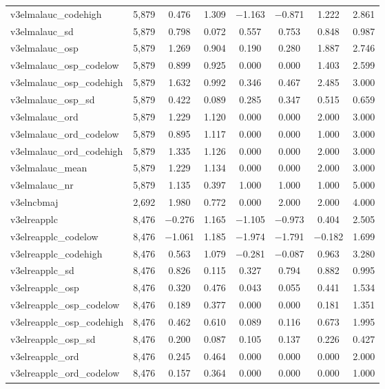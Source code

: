\begin{table}[!htbp]
\begin{tabular}{@{\extracolsep{5pt}}lccccccc}
v3elmalauc\_codehigh & 5,879 & 0.476 & 1.309 & $-$1.163 & $-$0.871 & 1.222 & 2.861 \\ 
v3elmalauc\_sd & 5,879 & 0.798 & 0.072 & 0.557 & 0.753 & 0.848 & 0.987 \\ 
v3elmalauc\_osp & 5,879 & 1.269 & 0.904 & 0.190 & 0.280 & 1.887 & 2.746 \\ 
v3elmalauc\_osp\_codelow & 5,879 & 0.899 & 0.925 & 0.000 & 0.000 & 1.403 & 2.599 \\ 
v3elmalauc\_osp\_codehigh & 5,879 & 1.632 & 0.992 & 0.346 & 0.467 & 2.485 & 3.000 \\ 
v3elmalauc\_osp\_sd & 5,879 & 0.422 & 0.089 & 0.285 & 0.347 & 0.515 & 0.659 \\ 
v3elmalauc\_ord & 5,879 & 1.229 & 1.120 & 0.000 & 0.000 & 2.000 & 3.000 \\ 
v3elmalauc\_ord\_codelow & 5,879 & 0.895 & 1.117 & 0.000 & 0.000 & 1.000 & 3.000 \\ 
v3elmalauc\_ord\_codehigh & 5,879 & 1.335 & 1.126 & 0.000 & 0.000 & 2.000 & 3.000 \\ 
v3elmalauc\_mean & 5,879 & 1.229 & 1.134 & 0.000 & 0.000 & 2.000 & 3.000 \\ 
v3elmalauc\_nr & 5,879 & 1.135 & 0.397 & 1.000 & 1.000 & 1.000 & 5.000 \\ 
v3elncbmaj & 2,692 & 1.980 & 0.772 & 0.000 & 2.000 & 2.000 & 4.000 \\ 
v3elreapplc & 8,476 & $-$0.276 & 1.165 & $-$1.105 & $-$0.973 & 0.404 & 2.505 \\ 
v3elreapplc\_codelow & 8,476 & $-$1.061 & 1.185 & $-$1.974 & $-$1.791 & $-$0.182 & 1.699 \\ 
v3elreapplc\_codehigh & 8,476 & 0.563 & 1.079 & $-$0.281 & $-$0.087 & 0.963 & 3.280 \\ 
v3elreapplc\_sd & 8,476 & 0.826 & 0.115 & 0.327 & 0.794 & 0.882 & 0.995 \\ 
v3elreapplc\_osp & 8,476 & 0.320 & 0.476 & 0.043 & 0.055 & 0.441 & 1.534 \\ 
v3elreapplc\_osp\_codelow & 8,476 & 0.189 & 0.377 & 0.000 & 0.000 & 0.181 & 1.351 \\ 
v3elreapplc\_osp\_codehigh & 8,476 & 0.462 & 0.610 & 0.089 & 0.116 & 0.673 & 1.995 \\ 
v3elreapplc\_osp\_sd & 8,476 & 0.200 & 0.087 & 0.105 & 0.137 & 0.226 & 0.427 \\ 
v3elreapplc\_ord & 8,476 & 0.245 & 0.464 & 0.000 & 0.000 & 0.000 & 2.000 \\ 
v3elreapplc\_ord\_codelow & 8,476 & 0.157 & 0.364 & 0.000 & 0.000 & 0.000 & 1.000 \\ 

\end{tabular}
\end{table}
